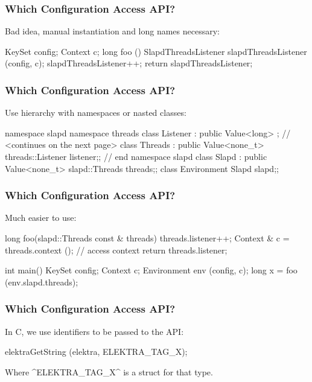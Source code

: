 \begin{frame}[fragile]
	\frametitle{Which Configuration Access API?}

	Bad idea, manual instantiation and long names necessary:
	\\[1em]
	\begin{code}[gobble=4,language=Cpp]
	KeySet config;
	Context c;
	long foo ()
	{
		SlapdThreadsListener slapdThreadsListener (config, c);
		slapdThreadsListener++;
		return slapdThreadsListener;
	}
	\end{code}
\end{frame}

\begin{frame}[fragile]
	\frametitle{Which Configuration Access API?}

	Use hierarchy with namespaces or nasted classes:
	\\[1em]
	\begin{code}[gobble=4,language=Cpp]
	namespace slapd
	{
	namespace threads
	{
	class Listener : public Value<long> {};
	}  // <continues on the next page>
	class Threads : public Value<none_t>
	{threads::Listener listener;};
	}  // end namespace slapd
	class Slapd : public Value<none_t>
	{slapd::Threads threads;};
	class Environment {Slapd slapd;};
	\end{code}
\end{frame}

\begin{frame}[fragile]
	\frametitle{Which Configuration Access API?}

	Much easier to use:
	\begin{code}[gobble=4,language=Cpp]
	long foo(slapd::Threads const & threads)
	{
		threads.listener++;
		Context & c = threads.context (); // access context
		return threads.listener;
	}

	int main()
	{
		KeySet config;
		Context c;
		Environment env (config, c);
		long x = foo (env.slapd.threads);
	}
	\end{code}
\end{frame}

\begin{frame}[fragile]
	\frametitle{Which Configuration Access API?}

	In C, we use identifiers to be passed to the API:
	\\[2em]
	\begin{code}[gobble=4,language=Cpp]
	elektraGetString (elektra, ELEKTRA_TAG_X);
	\end{code}
	Where ^ELEKTRA_TAG_X^ is a struct for that type.
\end{frame}

